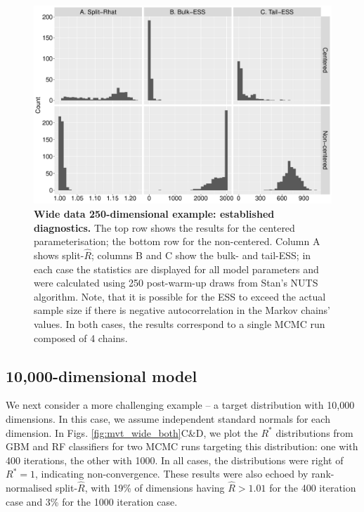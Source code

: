 \documentclass[ba]{imsart}
\numberwithin{equation}{section}
\theoremstyle{plain}
\begin{document}
\begin{supplement}
		\begin{figure}[!htb]
			\centerline{\includegraphics[width=1\textwidth]{wide_both_diagnostics.pdf}}
			\caption{\textbf{Wide data 250-dimensional example: established diagnostics.} The top row shows the results for the centered parameterisation; the bottom row for the non-centered. Column A shows split-$\widehat{R}$; columns B and C show the bulk- and tail-ESS; in each case the statistics are displayed for all model parameters and were calculated using 250 post-warm-up draws from Stan's NUTS algorithm. Note, that it is possible for the ESS to exceed the actual sample size if there is negative autocorrelation in the Markov chains' values. In both cases, the results correspond to a single MCMC run composed of 4 chains.}
			\label{fig:wide_both_diagnostics}
		\end{figure}
		
		\subsection{10,000-dimensional model}
		We next consider a more challenging example -- a target distribution with 10,000 dimensions. In this case, we assume independent standard normals for each dimension. In Figs. \ref{fig:mvt_wide_both}C\&D, we plot the $R^*$ distributions from GBM and RF classifiers for two MCMC runs targeting this distribution: one with 400 iterations, the other with 1000. In all cases, the distributions were right of $R^*=1$, indicating non-convergence. These results were also echoed by rank-normalised split-$\widehat{R}$, with 19\% of dimensions having $\widehat{R}>1.01$ for the 400 iteration case and 3\% for the 1000 iteration case.
		

\end{supplement}
\end{document}
